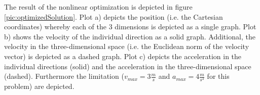 
The result of the nonlinear optimization is depicted in figure \ref{pic:optimizedSolution}. Plot a) depicts the position (i.e. the Cartesian coordinates) whereby each of the 3 dimensions is depicted as a single graph. Plot b) shows the velocity of the individual direction as a solid graph. Additional, the velocity in the three-dimensional space (i.e. the Euclidean norm of the velocity vector) is depicted as a dashed graph. Plot c) depicts the acceleration in the individual directions (solid) and the acceleration in the three-dimensional space (dashed). Furthermore the limitation ($v_{max} = 3 \frac{m}{s}$ and $a_{max} = 4 \frac{m}{s^2}$ for this problem) are depicted.

